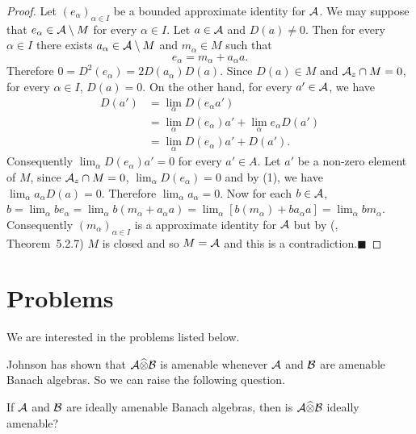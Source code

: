 \documentclass[fleqn]{mat01}
\begin{document}
\begin{proof}
Let $(e_\alpha)_{\alpha\in I}$ be a bounded approximate identity for
$\cal A$. We may suppose that $e_\alpha\in {\cal A}\setminus M$ for
every $\alpha\in I$. Let $a\in\cal A$ and $D(a)\neq 0$. Then for every
$\alpha\in I$ there exists $a_\alpha\in {\cal A}\setminus M$ and
$m_\alpha\in M$ such that
\begin{equation}
e_\alpha=m_\alpha+a_\alpha a.
\end{equation}
Therefore $0=D^2(e_\alpha)=2D(a_\alpha)D(a)$. Since $D(a)\in M$ and
${\cal A}_z\cap M=0$, for every $\alpha \in I$, $D(a)=0$. On the other
hand, for every $a'\in\cal A$, we have
\begin{align*}
D(a') &= \lim_\alpha D(e_\alpha a')\\[.2pc]
&= \lim_\alpha D(e_\alpha)a' +\lim_\alpha e_\alpha D(a')\\[.2pc]
&= \lim_\alpha D(e_\alpha)a'+D(a').
\end{align*}
Consequently $\displaystyle\lim_\alpha D(e_\alpha)a'=0$ for every $a'\in
A$. Let $a'$ be a non-zero element of $M$, since ${\cal A}_z\cap M=0$,
$\displaystyle\lim_\alpha D(e_\alpha)=0$ and by (1), we have
$\displaystyle\lim_\alpha a_\alpha D(a)=0$. Therefore
$\displaystyle\lim_\alpha a_\alpha=0$. Now for each $b \in \cal A$,
$b=\displaystyle\lim_\alpha be_\alpha = \displaystyle\lim_\alpha
b(m_\alpha + a_\alpha a)= \displaystyle\lim_\alpha [b(m_\alpha) +b
a_\alpha a]= \displaystyle\lim_\alpha bm_\alpha$. Consequently
$(m_\alpha)_{\alpha\in I}$ is a approximate identity for $\cal A$ but by
(\cite{Pa}, Theorem~5.2.7) $M$ is closed and so $M=\cal A$ and this is a
contradiction.\hfill $\blacksquare$
\end{proof}

\section{Problems}

We are interested in the problems listed below.

Johnson \cite{Jo1} has shown that $\cal A \widehat{\otimes} {\cal B}$
is amenable whenever $\cal A$ and $\cal B$ are amenable Banach algebras.
So we can raise the following question.

\setcounter{theo}{0}
\begin{quest}
{\rm If $\cal A$ and $\cal B$ are ideally amenable Banach algebras, then is
$\cal A \widehat{\otimes}\cal B$ ideally amenable?}
\end{quest}
\end{document}
